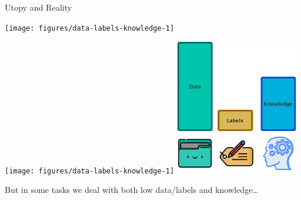 \documentclass[presentation]{beamer}\mode<presentation>{\usetheme{blackAMSBolognaFC}}
\begin{document}
\begin{frame}[allowframebreaks]{Utopy and Reality}

    \hspace{0.5cm}
    \texttt{[image: figures/data-labels-knowledge-1]}
    \hfill

    \framebreak

    \hspace{0.5cm}
    {\texttt{[image: figures/data-labels-knowledge-1]}}
    \hfill
    \includegraphics[width=0.4\textwidth]{figures/data-labels-knowledge-2}
    \hspace{0.5cm}

    \framebreak

    \centering
    But in some tasks we deal with both low data/labels and knowledge\dots

\end{frame}
\end{document}
